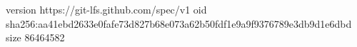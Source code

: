 version https://git-lfs.github.com/spec/v1
oid sha256:aa41ebd2633e0fafe73d827b68e073a62b50fdf1e9a9f9376789e3db9d1e6dbd
size 86464582
